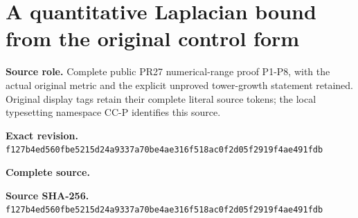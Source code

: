 \begingroup
\sloppy
\small
\makeatletter
\let\EndpointOriginalTagForm\tagform@
\def\tagform@#1{\EndpointOriginalTagForm{CC-P\, #1}}
\makeatother
\clearpage
\section{A quantitative Laplacian bound from the original control form}
\noindent\textbf{Source role.} Complete public PR27 numerical-range proof P1-P8, with the actual original metric and the explicit unproved tower-growth statement retained. Original display tags retain their complete literal source tokens; the local typesetting namespace CC-P identifies this source.\par
\noindent\textbf{Exact revision.} \nolinkurl{f127b4ed560fbe5215d24a9337a70be4ae316f518ac0f2d05f2919f4ae491fdb}\par
\noindent\textbf{Complete source.} \par
\noindent\textbf{Source SHA-256.} \nolinkurl{f127b4ed560fbe5215d24a9337a70be4ae316f518ac0f2d05f2919f4ae491fdb}\par\medskip

\endgroup
